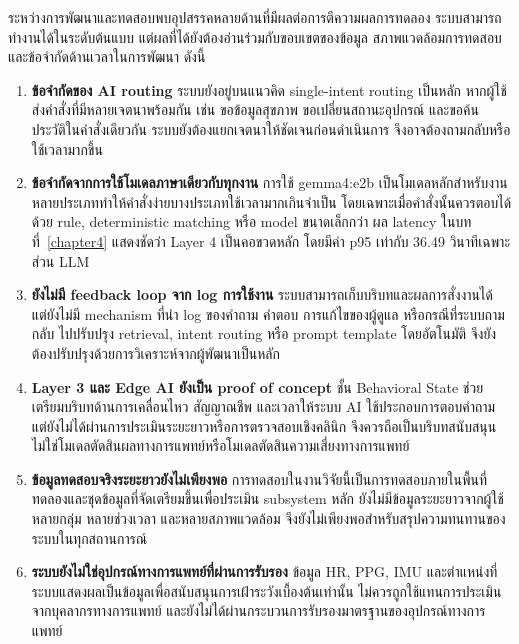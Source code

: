 ระหว่างการพัฒนาและทดสอบพบอุปสรรคหลายด้านที่มีผลต่อการตีความผลการทดลอง ระบบสามารถทำงานได้ในระดับต้นแบบ แต่ผลที่ได้ยังต้องอ่านร่วมกับขอบเขตของข้อมูล สภาพแวดล้อมการทดสอบ และข้อจำกัดด้านเวลาในการพัฒนา ดังนี้

\begin{enumerate}
    \item \textbf{ข้อจำกัดของ AI routing} ระบบยังอยู่บนแนวคิด single-intent routing เป็นหลัก หากผู้ใช้ส่งคำสั่งที่มีหลายเจตนาพร้อมกัน เช่น ขอข้อมูลสุขภาพ ขอเปลี่ยนสถานะอุปกรณ์ และขอค้นประวัติในคำสั่งเดียวกัน ระบบยังต้องแยกเจตนาให้ชัดเจนก่อนดำเนินการ จึงอาจต้องถามกลับหรือใช้เวลามากขึ้น

    \item \textbf{ข้อจำกัดจากการใช้โมเดลภาษาเดียวกับทุกงาน} การใช้ gemma4:e2b เป็นโมเดลหลักสำหรับงานหลายประเภททำให้คำสั่งง่ายบางประเภทใช้เวลามากเกินจำเป็น โดยเฉพาะเมื่อคำสั่งนั้นควรตอบได้ด้วย rule, deterministic matching หรือ model ขนาดเล็กกว่า ผล latency ในบทที่~\ref{chapter4} แสดงชัดว่า Layer 4 เป็นคอขวดหลัก โดยมีค่า p95 เท่ากับ 36.49 วินาทีเฉพาะส่วน LLM

    \item \textbf{ยังไม่มี feedback loop จาก log การใช้งาน} ระบบสามารถเก็บบริบทและผลการสั่งงานได้ แต่ยังไม่มี mechanism ที่นำ log ของคำถาม คำตอบ การแก้ไขของผู้ดูแล หรือกรณีที่ระบบถามกลับ ไปปรับปรุง retrieval, intent routing หรือ prompt template โดยอัตโนมัติ จึงยังต้องปรับปรุงด้วยการวิเคราะห์จากผู้พัฒนาเป็นหลัก

    \item \textbf{Layer 3 และ Edge AI ยังเป็น proof of concept} ชั้น Behavioral State ช่วยเตรียมบริบทด้านการเคลื่อนไหว สัญญาณชีพ และเวลาให้ระบบ AI ใช้ประกอบการตอบคำถาม แต่ยังไม่ได้ผ่านการประเมินระยะยาวหรือการตรวจสอบเชิงคลินิก จึงควรถือเป็นบริบทสนับสนุน ไม่ใช่โมเดลตัดสินผลทางการแพทย์หรือโมเดลตัดสินความเสี่ยงทางการแพทย์

    \item \textbf{ข้อมูลทดสอบจริงระยะยาวยังไม่เพียงพอ} การทดสอบในงานวิจัยนี้เป็นการทดสอบภายในพื้นที่ทดลองและชุดข้อมูลที่จัดเตรียมขึ้นเพื่อประเมิน subsystem หลัก ยังไม่มีข้อมูลระยะยาวจากผู้ใช้หลายกลุ่ม หลายช่วงเวลา และหลายสภาพแวดล้อม จึงยังไม่เพียงพอสำหรับสรุปความทนทานของระบบในทุกสถานการณ์

    \item \textbf{ระบบยังไม่ใช่อุปกรณ์ทางการแพทย์ที่ผ่านการรับรอง} ข้อมูล HR, PPG, IMU และตำแหน่งที่ระบบแสดงผลเป็นข้อมูลเพื่อสนับสนุนการเฝ้าระวังเบื้องต้นเท่านั้น ไม่ควรถูกใช้แทนการประเมินจากบุคลากรทางการแพทย์ และยังไม่ได้ผ่านกระบวนการรับรองมาตรฐานของอุปกรณ์ทางการแพทย์


\end{enumerate}
